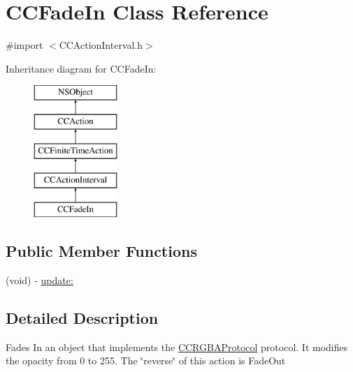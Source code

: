 \hypertarget{interface_c_c_fade_in}{\section{C\-C\-Fade\-In Class Reference}
\label{interface_c_c_fade_in}
}


{\ttfamily \#import $<$C\-C\-Action\-Interval.\-h$>$}

Inheritance diagram for C\-C\-Fade\-In\-:\begin{figure}[H]
\begin{center}
\leavevmode
\includegraphics[height=5.000000cm]{interface_c_c_fade_in}
\end{center}
\end{figure}
\subsection*{Public Member Functions}
\begin{DoxyCompactItemize}
\item 
(void) -\/ \hyperlink{interface_c_c_fade_in_a0804c9113f29c407ea182b58a477653e}{update\-:}
\end{DoxyCompactItemize}


\subsection{Detailed Description}
Fades In an object that implements the \hyperlink{protocol_c_c_r_g_b_a_protocol-p}{C\-C\-R\-G\-B\-A\-Protocol} protocol. It modifies the opacity from 0 to 255. The \char`\"{}reverse\char`\"{} of this action is Fade\-Out 

